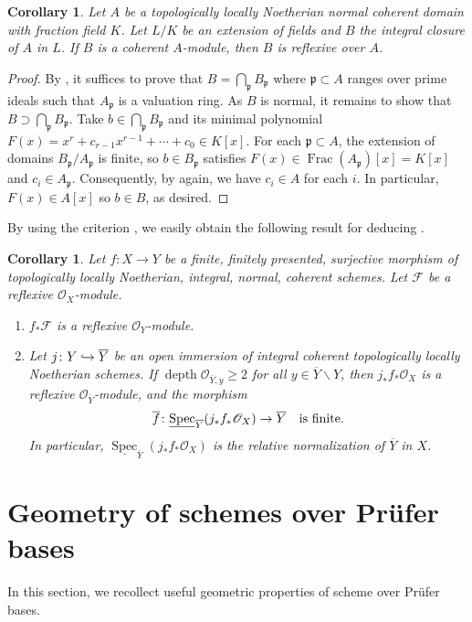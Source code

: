 \documentclass[JEP,XML,SOM,Unicode,published]{cedram}
\newenvironment{enumeratei}
{\bgroup\def\theenumi{\roman{enumi}}\def\theenumii{\arabic{enumii}}\begin{enumerate}}
{\end{enumerate}\egroup}
\newcommand\hto{\mathrel{\lhook\joinrel\to}}
\let\backslash\smallsetminus
\newcommand{\fp}{\mathfrak{p}}
\newcommand{\sF}{\mathscr{F}}
\newcommand{\sO}{\mathscr{O}}
\let\hra\hto
\let\ov\overline
\let\un\underline
\let\x\text
\let\q\quad
\DeclareMathOperator{\Spec}{Spec}
\DeclareMathOperator{\Frac}{Frac}
\DeclareMathOperator{\depth}{depth}
\newcommand{\bpf}{\begin{proof}}
\newcommand{\epf}{\end{proof}}
\newcommand{\bcor}{\begin{cor}}
\newcommand{\ecor}{\end{cor}}
\newcommand{\benumr}{\begin{enumeratei}}
\newcommand{\eenumr}{\end{enumeratei}}
\theoremstyle{plain}
\newtheorem{cor}[subsection]{Corollary}
\theoremstyle{definition}
\begin{document}
\bcor
Let $A$ be a topologically locally Noetherian normal coherent domain with fraction field $K$.
Let $L/K$ be an extension of fields and $B$ the integral closure of $A$ in $L$.
If $B$ is a coherent $A$\nobreakdash-mod\-ule, then $B$ is reflexive over $A$.
\ecor
\bpf
By , it suffices to prove that $B=\bigcap_{\fp}B_{\fp}$ where $\fp\subset A$ ranges over prime ideals such that $A_{\fp}$ is a valuation ring.
As $B$ is normal, it remains to show that $B\supset \bigcap_{\fp}B_{\fp}$.
Take $b\in \bigcap_{\fp}B_{\fp}$ and its minimal polynomial $F(x)=x^r+c_{r-1}x^{r-1}+\cdots +c_0\in K[x]$.
For each $\fp\subset A$, the extension of domains $B_{\fp}/A_{\fp}$ is finite, so $b\in B_{\fp}$ satisfies $F(x)\in \Frac(A_{\fp})[x]=K[x]$ and $c_i\in A_{\fp}$.
Consequently, by  again, we have $c_i\in A$ for each $i$.
In particular, $F(x)\in A[x]$ so $b\in B$, as desired.
\epf
By using the criterion , we easily obtain the following result for deducing .
\bcor\label{pp-ref}
Let $f\colon X\to Y$ be a finite, finitely presented, surjective morphism of topologically locally Noetherian, integral, normal, coherent schemes.
Let $\sF$ be a reflexive $\sO_X$\nobreakdash-mod\-ule.
\benumr
\item $f_{\ast}\sF$ is a reflexive $\sO_Y$\nobreakdash-mod\-ule.
\item Let $j\colon Y\hra \ov{Y}$ be an open immersion of integral coherent topologically locally Noetherian schemes.
If $\depth\sO_{\ov{Y},y}\geq 2$ for all $y\in \ov{Y}\backslash Y$, then $j_{\ast}f_{\ast}\sO_X$ is a reflexive $\sO_{\ov{Y}}$\nobreakdash-mod\-ule, and the morphism
\[
\x{$\ov{f}\colon \un{\Spec}_{\ov{Y}}(j_{\ast}f_{\ast}\sO_X)\to \ov{Y}$\q is finite.}
\]
In particular, $\un{\Spec}_{\ov{Y}}(j_{\ast}f_{\ast}\sO_X)$ is the relative normalization of $\ov{Y}$ in $X$.
\eenumr
\ecor

\section{Geometry of schemes over Prüfer bases}
In this section, we recollect useful geometric properties of scheme over Prüfer bases.
\end{document}
